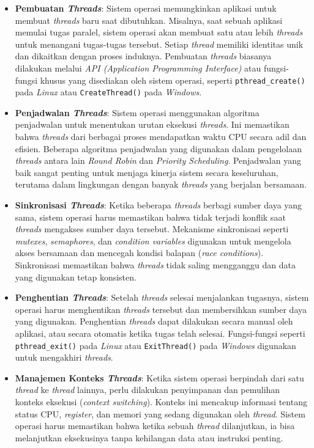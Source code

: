 \documentclass[12pt]{article}
\begin{document}
\begin{itemize}
    \item \textbf{Pembuatan \textit{Threads}}: Sistem operasi memungkinkan aplikasi untuk membuat \textit{threads} baru saat dibutuhkan. Misalnya, saat sebuah aplikasi memulai tugas paralel, sistem operasi akan membuat satu atau lebih \textit{threads} untuk menangani tugas-tugas tersebut. Setiap \textit{thread} memiliki identitas unik dan dikaitkan dengan proses induknya. Pembuatan \textit{threads} biasanya dilakukan melalui \textit{API (Application Programming Interface)} atau fungsi-fungsi khusus yang disediakan oleh sistem operasi, seperti \texttt{pthread\_create()} pada \textit{Linux} atau \texttt{CreateThread()} pada \textit{Windows}.

    \item \textbf{Penjadwalan \textit{Threads}}: Sistem operasi menggunakan algoritma penjadwalan untuk menentukan urutan eksekusi \textit{threads}. Ini memastikan bahwa \textit{threads} dari berbagai proses mendapatkan waktu CPU secara adil dan efisien. Beberapa algoritma penjadwalan yang digunakan dalam pengelolaan \textit{threads} antara lain \textit{Round Robin} dan \textit{Priority Scheduling}. Penjadwalan yang baik sangat penting untuk menjaga kinerja sistem secara keseluruhan, terutama dalam lingkungan dengan banyak \textit{threads} yang berjalan bersamaan.

    \item \textbf{Sinkronisasi \textit{Threads}}: Ketika beberapa \textit{threads} berbagi sumber daya yang sama, sistem operasi harus memastikan bahwa tidak terjadi konflik saat \textit{threads} mengakses sumber daya tersebut. Mekanisme sinkronisasi seperti \textit{mutexes}, \textit{semaphores}, dan \textit{condition variables} digunakan untuk mengelola akses bersamaan dan mencegah kondisi balapan (\textit{race conditions}). Sinkronisasi memastikan bahwa \textit{threads} tidak saling mengganggu dan data yang digunakan tetap konsisten.

    \item \textbf{Penghentian \textit{Threads}}: Setelah \textit{threads} selesai menjalankan tugasnya, sistem operasi harus menghentikan \textit{threads} tersebut dan membersihkan sumber daya yang digunakan. Penghentian \textit{threads} dapat dilakukan secara manual oleh aplikasi, atau secara otomatis ketika tugas telah selesai. Fungsi-fungsi seperti \texttt{pthread\_exit()} pada \textit{Linux} atau \texttt{ExitThread()} pada \textit{Windows} digunakan untuk mengakhiri \textit{threads}.

    \item \textbf{Manajemen Konteks \textit{Threads}}: Ketika sistem operasi berpindah dari satu \textit{thread} ke \textit{thread} lainnya, perlu dilakukan penyimpanan dan pemulihan konteks eksekusi (\textit{context switching}). Konteks ini mencakup informasi tentang status CPU, \textit{register}, dan memori yang sedang digunakan oleh \textit{thread}. Sistem operasi harus memastikan bahwa ketika sebuah \textit{thread} dilanjutkan, ia bisa melanjutkan eksekusinya tanpa kehilangan data atau instruksi penting.
\end{itemize}
\end{document}
